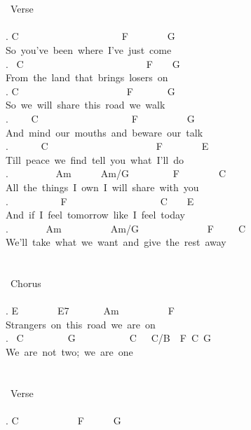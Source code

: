 {\\
\\
\lbrack\ Verse\rbrack\\
\\
. C\ \ \ \ \ \ \ \ \ \ \ \ \ \ \ \ \ \ \ \ \ F\ \ \ \ \ \ \ \ G\\
So\ you've\ been\ where\ I've\ just\ come\\
. \ C\ \ \ \ \ \ \ \ \ \ \ \ \ \ \ \ \ \ \ \ \ \ \ \ \ F\ \ \ \ G\\
From\ the\ land\ that\ brings\ losers\ on\\
. C\ \ \ \ \ \ \ \ \ \ \ \ \ \ \ \ \ \ \ \ \ \ F\ \ \ \ \ \ \ G\\
So\ we\ will\ share\ this\ road\ we\ walk\\
. \ \ \ \ C\ \ \ \ \ \ \ \ \ \ \ \ \ \ \ \ \ \ \ F\ \ \ \ \ \ \ \ \ \ G\\
And\ mind\ our\ mouths\ and\ beware\ our\ talk\\
. \ \ \ \ \ \ C\ \ \ \ \ \ \ \ \ \ \ \ \ \ \ \ \ \ \ \ \ \ F\ \ \ \ \ \ \ \ E\\
Till\ peace\ we\ find\ tell\ you\ what\ I'll\ do\\
. \ \ \ \ \ \ \ \ \ Am\ \ \ \ \ \ Am/G\ \ \ \ \ \ \ \ \ F\ \ \ \ \ \ \ \ C\\
All\ the\ things\ I\ own\ I\ will\ share\ with\ you\\
. \ \ \ \ \ \ \ \ \ \ F\ \ \ \ \ \ \ \ \ \ \ \ \ \ \ \ \ \ \ C\ \ \ \ E\\
And\ if\ I\ feel\ tomorrow\ like\ I\ feel\ today\\
. \ \ \ \ \ \ \ Am\ \ \ \ \ \ \ \ \ \ Am/G\ \ \ \ \ \ \ \ \ \ \ \ \ \ F\ \ \ \ \ C\\
We'll\ take\ what\ we\ want\ and\ give\ the\ rest\ away\ \\
\\
\\
\lbrack\ Chorus\rbrack\\
\\
. E\ \ \ \ \ \ \ \ E7\ \ \ \ \ \ \ Am\ \ \ \ \ \ \ \ \ \ F\\
Strangers\ on\ this\ road\ we\ are\ on\\
. \ C\ \ \ \ \ \ \ \ \ G\ \ \ \ \ \ \ \ \ \ \ C\ \ \ C/B\ \ F\ C\ G\\
We\ are\ not\ two;\ we\ are\ one\\
\\
\\
\lbrack\ Verse\rbrack\\
\\
. C\ \ \ \ \ \ \ \ \ \ \ \ F\ \ \ \ \ \ G\\
}
